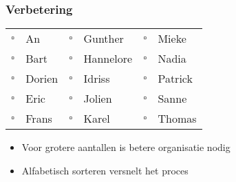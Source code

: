 \documentclass[dutch]{ucll-slides}
\begin{document}
\begin{frame}
  \frametitle{Verbetering}
  \begin{center}
    \begin{tabular}{rlrlrl}
      $\square$ & An      & $\square$ & Gunther   & $\square$ & Mieke \\
      $\square$ & Bart    & $\square$ & Hannelore & $\square$ & Nadia \\
      $\square$ & Dorien  & $\square$ & Idriss    & $\square$ & Patrick \\
      $\square$ & Eric    & $\square$ & Jolien    & $\square$ & Sanne \\
      $\square$ & Frans   & $\square$ & Karel     & $\square$ & Thomas \\
    \end{tabular}
  \end{center}
  \begin{itemize}
    \item Voor grotere aantallen is betere organisatie nodig
    \item Alfabetisch sorteren versnelt het proces
  \end{itemize}
\end{frame}
\end{document}
